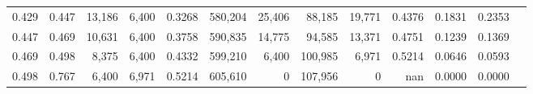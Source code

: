 \begin{tabular}{rrrrrrrrrrrrr}
0.429 & 0.447 &  13,186 & 6,400 &                                     0.3268 & 580,204 &  25,406 &  88,185 &  19,771 & 0.4376 & 0.1831 & 0.2353 \\
0.447 & 0.469 &  10,631 & 6,400 &                                     0.3758 & 590,835 &  14,775 &  94,585 &  13,371 & 0.4751 & 0.1239 & 0.1369 \\
0.469 & 0.498 &   8,375 & 6,400 &                                     0.4332 & 599,210 &   6,400 & 100,985 &   6,971 & 0.5214 & 0.0646 & 0.0593 \\
0.498 & 0.767 &   6,400 & 6,971 &                                     0.5214 & 605,610 &       0 & 107,956 &       0 &    nan & 0.0000 & 0.0000 \\
\bottomrule
\end{tabular}
